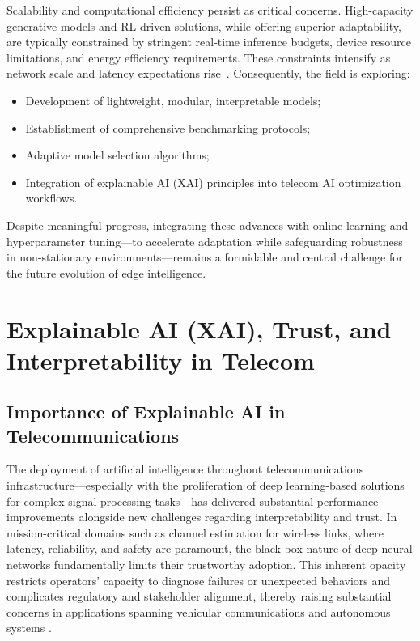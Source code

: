 \documentclass[sigconf]{acmart}
\begin{document}
Scalability and computational efficiency persist as critical concerns. High-capacity generative models and RL-driven solutions, while offering superior adaptability, are typically constrained by stringent real-time inference budgets, device resource limitations, and energy efficiency requirements. These constraints intensify as network scale and latency expectations rise~\cite{ref43,ref44,ref48}. Consequently, the field is exploring:

\begin{itemize}
    \item Development of lightweight, modular, interpretable models;
    \item Establishment of comprehensive benchmarking protocols;
    \item Adaptive model selection algorithms;
    \item Integration of explainable AI (XAI) principles into telecom AI optimization workflows.
\end{itemize}

Despite meaningful progress, integrating these advances with online learning and hyperparameter tuning—to accelerate adaptation while safeguarding robustness in non-stationary environments—remains a formidable and central challenge for the future evolution of edge intelligence.

\section{Explainable AI (XAI), Trust, and Interpretability in Telecom}

\subsection{Importance of Explainable AI in Telecommunications}

The deployment of artificial intelligence throughout telecommunications infrastructure—especially with the proliferation of deep learning-based solutions for complex signal processing tasks—has delivered substantial performance improvements alongside new challenges regarding interpretability and trust. In mission-critical domains such as channel estimation for wireless links, where latency, reliability, and safety are paramount, the black-box nature of deep neural networks fundamentally limits their trustworthy adoption. This inherent opacity restricts operators' capacity to diagnose failures or unexpected behaviors and complicates regulatory and stakeholder alignment, thereby raising substantial concerns in applications spanning vehicular communications and autonomous systems \cite{ref38}\cite{ref41}.
\end{document}
